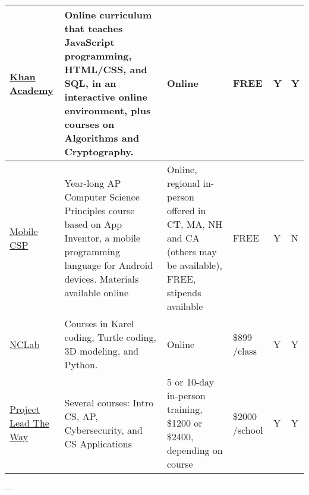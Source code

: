 \begin{longtable}{p{2cm}p{4cm}p{3cm}p{1.3cm}p{1.3cm}p{1.3cm}}
\href{https://www.khanacademy.org/computing/computer-science}{Khan Academy} & Online curriculum that teaches JavaScript programming, HTML/CSS, and SQL, in an interactive online environment, plus courses on Algorithms and Cryptography.  & Online & FREE & Y & Y \\ \hline
\href{https://ram8647.appspot.com/mobileCSP/}{Mobile CSP} & Year-long AP Computer Science Principles course based on App Inventor, a mobile programming language for Android devices. Materials available online & Online, regional in-person offered in CT, MA, NH and CA (others may be available), FREE, stipends available & FREE & Y & N \\ \hline
\href{https://nclab.com/karel/}{NCLab} & Courses in Karel coding, Turtle coding, 3D modeling, and Python. & Online & \$899 /class & Y & Y \\ \hline
\href{https://www.pltw.org/faq/computer-science}{Project Lead The Way} & Several courses: Intro CS, AP, Cybersecurity, and CS Applications & 5 or 10-day in-person training, \$1200 or \$2400, depending on course & \$2000 /school & Y & Y \\ \hline
\end{longtable}	

---

